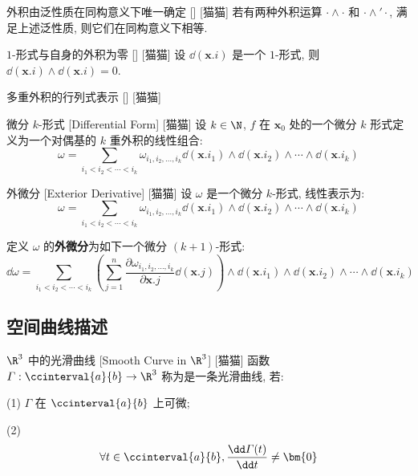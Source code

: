 \documentclass[UTF8]{ctexart}
\begin{document}
			\begin{ppt}
			    []
			    {外积由泛性质在同构意义下唯一确定}
			    []
			    [猫猫]
				若有两种外积运算 \(\cdot\wedge\cdot\) 和 \(\cdot\wedge'\cdot\), 满足上述泛性质, 则它们在同构意义下相等. 
			\end{ppt}
			
			\begin{ppt}
				[]
				{\(1\)-形式与自身的外积为零}
				[]
				[猫猫]
				设 \(\dd(\bm{x}.i)\) 是一个 \(1\)-形式, 则 \(\dd(\bm{x}.i)\wedge\dd(\bm{x}.i)=0\). 
			\end{ppt}

			\begin{ppt}
			    []
			    {多重外积的行列式表示}
			    []
			    [猫猫]
			\end{ppt}

			\begin{dfn}
			    []
			    {微分 \(k\)-形式}
			    [Differential Form]
			    [猫猫]
				设 \(k\in\N\), \(f\) 在 \(\bm{x}_0\) 处的一个微分 \(k\) 形式定义为一个对偶基的 \(k\) 重外积的线性组合: 
				\[\omega=\sum_{i_1<i_2<\cdots<i_k}\omega_{i_1,i_2,\dots,i_k}\dd(\bm{x}.i_1)\wedge\dd(\bm{x}.i_2)\wedge\cdots\wedge\dd(\bm{x}.i_k)\]
			\end{dfn}

			\begin{dfn}
			    []
			    {外微分}
			    [Exterior Derivative]
			    [猫猫]
				设 \(\omega\) 是一个微分 \(k\)-形式, 线性表示为: 
				\[\omega=\sum_{i_1<i_2<\cdots<i_k}\omega_{i_1,i_2,\dots,i_k}\dd(\bm{x}.i_1)\wedge\dd(\bm{x}.i_2)\wedge\cdots\wedge\dd(\bm{x}.i_k)\]

				定义 \(\omega\) 的\textbf{外微分}为如下一个微分 \((k+1)\)-形式: 
				\[\dd\omega=\sum_{i_1<i_2<\cdots<i_k}\left(\sum_{j=1}^n\frac{\partial \omega_{i_1,i_2,\dots,i_k}}{\partial \bm{x}.j}\dd(\bm{x}.j)\right)\wedge\dd(\bm{x}.i_1)\wedge\dd(\bm{x}.i_2)\wedge\cdots\wedge\dd(\bm{x}.i_k)\]
			\end{dfn}

		\subsection{空间曲线描述}
			
			\begin{dfn}
				[]
				{\(\R^3\) 中的光滑曲线}
				[Smooth Curve in \(\R^3\)]
				[猫猫]
				函数 \(\varGamma:\ccinterval{a}{b}\to\R^3\) 称为是一条光滑曲线, 若: 

				(1) \(\varGamma\) 在 \(\ccinterval{a}{b}\) 上可微; 

				(2) \[\forall t\in\ccinterval{a}{b}, \frac{\dd\varGamma(t)}{\dd t}\neq\bm{0}\]
			\end{dfn}
			
\end{document}
